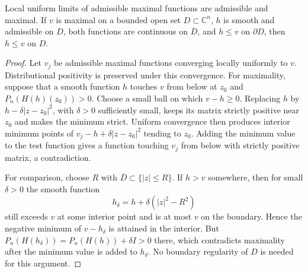 \begin{lemma}\label{lem:cone-maximal-stability-comparison}
Local uniform limits of admissible maximal functions are admissible and maximal. If $v$ is maximal on a bounded open set $D\subset\mathbb C^n$, $h$ is smooth and admissible on $D$, both functions are continuous on $\overline D$, and $h\leq v$ on $\partial D$, then $h\leq v$ on $D$.
\end{lemma}
\begin{proof}
Let $v_j$ be admissible maximal functions converging locally uniformly to $v$. Distributional positivity is preserved under this convergence. For maximality, suppose that a smooth function $h$ touches $v$ from below at $z_0$ and $P_n(H(h)(z_0))>0$. Choose a small ball on which $v-h\geq0$. Replacing $h$ by $h-\delta|z-z_0|^2$, with $\delta>0$ sufficiently small, keeps its matrix strictly positive near $z_0$ and makes the minimum strict. Uniform convergence then produces interior minimum points of $v_j-h+\delta|z-z_0|^2$ tending to $z_0$. Adding the minimum value to the test function gives a function touching $v_j$ from below with strictly positive matrix, a contradiction.

For comparison, choose $R$ with $\overline D\subset\{|z|\leq R\}$. If $h>v$ somewhere, then for small $\delta>0$ the smooth function
\[
 h_\delta=h+\delta(|z|^2-R^2)
\]
still exceeds $v$ at some interior point and is at most $v$ on the boundary. Hence the negative minimum of $v-h_\delta$ is attained in the interior. But
$P_n(H(h_\delta))=P_n(H(h))+\delta I>0$ there, which contradicts maximality after the minimum value is added to $h_\delta$. No boundary regularity of $D$ is needed for this argument.
\end{proof}

